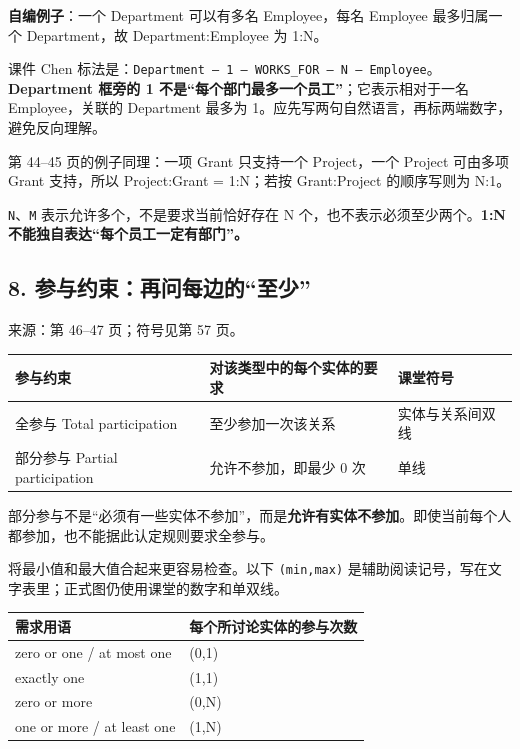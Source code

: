 \textbf{自编例子}：一个 Department 可以有多名 Employee，每名 Employee 最多归属一个 Department，故 Department:Employee 为 1:N。

课件 Chen 标法是：\texttt{Department\ —\ 1\ —\ WORKS\_FOR\ —\ N\ —\ Employee}。\textbf{Department 框旁的 1 不是``每个部门最多一个员工''}；它表示相对于一名 Employee，关联的 Department 最多为 1。应先写两句自然语言，再标两端数字，避免反向理解。

第 44--45 页的例子同理：一项 Grant 只支持一个 Project，一个 Project 可由多项 Grant 支持，所以 Project:Grant = 1:N；若按 Grant:Project 的顺序写则为 N:1。

\texttt{N}、\texttt{M} 表示允许多个，不是要求当前恰好存在 N 个，也不表示必须至少两个。\textbf{1:N 不能独自表达``每个员工一定有部门''。}

\subsection{8. 参与约束：再问每边的``至少''}\label{02_er_modelling_zh-ux53c2ux4e0eux7ea6ux675fux518dux95eeux6bcfux8fb9ux7684ux81f3ux5c11}

来源：第 46--47 页；符号见第 57 页。

\begin{longtable}[]{@{}lll@{}}
\toprule\noalign{}
参与约束 & 对该类型中的每个实体的要求 & 课堂符号 \\
\midrule\noalign{}
\endhead
\bottomrule\noalign{}
\endlastfoot
全参与 Total participation & 至少参加一次该关系 & 实体与关系间双线 \\
部分参与 Partial participation & 允许不参加，即最少 0 次 & 单线 \\
\end{longtable}

部分参与不是``必须有一些实体不参加''，而是\textbf{允许有实体不参加}。即使当前每个人都参加，也不能据此认定规则要求全参与。

将最小值和最大值合起来更容易检查。以下 \texttt{(\allowbreak{}min,\allowbreak{}max)\allowbreak{}} 是辅助阅读记号，写在文字表里；正式图仍使用课堂的数字和单双线。

\begin{longtable}[]{@{}ll@{}}
\toprule\noalign{}
需求用语 & 每个所讨论实体的参与次数 \\
\midrule\noalign{}
\endhead
\bottomrule\noalign{}
\endlastfoot
zero or one / at most one & (0,1) \\
exactly one & (1,1) \\
zero or more & (0,N) \\
one or more / at least one & (1,N) \\
\end{longtable}

